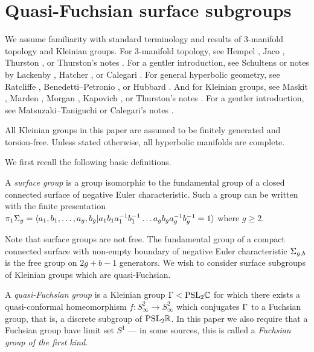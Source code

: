 \section{Quasi-Fuchsian surface subgroups}

We assume familiarity with standard terminology and results of $3$-manifold
topology and Kleinian groups.  For $3$-manifold topology, see Hempel \cite{He},
Jaco \cite{Ja}, Thurston \cite{Thurstonbook}, or Thurston's notes
\cite{Thurstonnotes}.  For a gentler introduction, see Schultens \cite{Sch} or
notes by Lackenby \cite{Lackenbynotes}, Hatcher \cite{Hatchernotes}, or
Calegari \cite{Calegarinotes2}. For general hyperbolic geometry, see Ratcliffe
\cite{Ratcliffe}, Benedetti--Petronio \cite{BenedettiPetronio}, or Hubbard
\cite{Hubbard}.  And for Kleinian groups, see Maskit \cite{Maskit}, Marden
\cite{Marden}, Morgan \cite{Mo}, Kapovich \cite{Kapovich}, or Thurston's notes
\cite{Thurstonnotes}.  For a gentler introduction, see Matsuzaki--Taniguchi
\cite{MatsuzakiTaniguchi} or Calegari's notes \cite{Calegarinotes}.

All Kleinian groups in this paper are assumed to be finitely generated and
torsion-free. Unless stated otherwise, all hyperbolic manifolds are complete.

We first recall the following basic definitions.

\begin{defn}

A \emph{surface group} is a group isomorphic to the fundamental group of
a closed connected surface of negative Euler characteristic. Such a group can
be written with the finite presentation
%
$\pi_1 \Sigma_g = \langle a_1,b_1,\dots,a_g,b_g | a_1b_1a_1^{-1}b_1^{-1} \dots
a_gb_ga_g^{-1}b_g^{-1} = 1\rangle$
%
where $g \geq 2$.

\end{defn}

Note that surface groups are not free. The fundamental group of a compact
connected surface with non-empty boundary of negative Euler characteristic
$\Sigma_{g,b}$ is the free group on $2g + b - 1$ generators. We wish to consider
surface subgroups of Kleinian groups which are quasi-Fuchsian.

\begin{defn}

A \emph{quasi-Fuchsian group} is a Kleinian group $\Gamma < \mathrm{PSL}_2\mathbb{C}$ for which
there exists a quasi-conformal homeomorphism $f \colon S^2_\infty \to
S^2_\infty$ which conjugates $\Gamma$ to a Fuchsian group, that is, a discrete
subgroup of $\mathrm{PSL}_2\mathbb{R}$. In this paper we also require that a Fuchsian group
have limit set $S^1$ --- in some sources, this is called a \emph{Fuchsian group
of the first kind}.

\end{defn}

